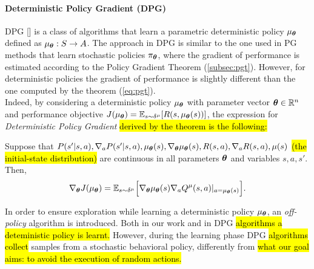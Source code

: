 \paragraph{Deterministic Policy Gradient (DPG)} \label{subsec:dpg}
\ac{DPG} [\cite{article}] is a class of algorithms that learn a parametric deterministic policy $\mu_{\boldsymbol{\theta}}$ defined as $\mu_{\boldsymbol{\theta}}: S \to A$. The approach in \ac{DPG} is similar to the one used in \ac{PG} methods that learn stochastic policies $\pi_{\boldsymbol{\theta}}$, where the gradient of performance is estimated according to the Policy Gradient Theorem (\ref{subsec:pgt}). However, for deterministic policies the gradient of performance is slightly different than the one computed by the theorem (\ref{eq:pgt}).\\
\newline
Indeed, by considering a deterministic policy $\mu_{\boldsymbol{\theta}}$ with parameter vector $\boldsymbol{\theta} \in \mathbb{R}^n$ and performance objective $J(\mu_{\boldsymbol{\theta}}) = \mathbb{E}_{s \sim \delta^{\mu}}[R(s, \mu_{\boldsymbol{\theta}}(s))]$, the expression for \emph{Deterministic Policy Gradient} \hl{derived by the theorem is the following:}
\begin{theorem} \label{th:dpgt}
	Suppose that $P(s'|s,a), \nabla_aP(s'|s,a), \mu_{\boldsymbol{\theta}}(s), \nabla_{\boldsymbol{\theta}} \mu_{\boldsymbol{\theta}}(s), R(s,a), \nabla_a R(s,a), \mu(s)$ \hl{(the initial-state distribution)}  are continuous in all parameters $\boldsymbol{\theta}$ and variables $s, a, s'$. Then, 
	\begin{align}
	\nabla_{\boldsymbol{\theta}}J(\mu_{\boldsymbol{\theta}}) = \mathbb{E}_{s \sim \delta^{\mu}} \Big[\nabla_{\boldsymbol{\theta}} \mu_{\boldsymbol{\theta}} (s) \nabla_a Q^{\mu}(s,a)|_{a = \mu_{\boldsymbol{\theta}} (s)}\Big].
	\end{align}
\end{theorem}
\noindent In order to ensure exploration while learning a deterministic policy $\mu_{\boldsymbol{\theta}}$, an \emph{off-policy} algorithm is introduced. %
Both in our work and in \ac{DPG} \hl{algorithms a deteministic policy is learnt.} However, during the learning phase \ac{DPG} \hl{algorithms collect} samples from a stochastic behavioral policy, differently from \hl{what our goal aims: to avoid the execution of random actions.}\\
